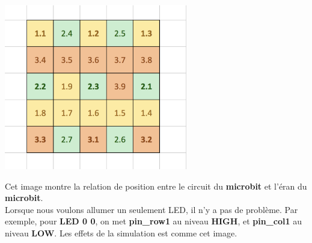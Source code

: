 \documentclass[14px]{article}
\begin{document}
\centering
\includegraphics[width=0.6\textwidth]{matrice_Pins.png}

Cet image montre la relation de position entre le circuit du  \textbf{microbit} et l'éran du \textbf{microbit}.\\

Lorsque nous voulons allumer un seulement LED, il n'y a pas de problème. Par exemple, pour \textbf{LED 0 0}, on met \textbf{pin\_row1} au niveau \textbf{HIGH}, et \textbf{pin\_col1} au niveau \textbf{LOW}. Les effets de la simulation est comme cet image.
\begin{figure}[htbp]
\end{figure}

\clearpage
\end{document}
